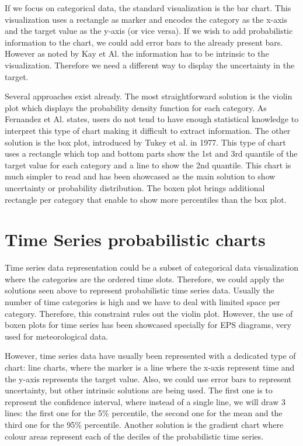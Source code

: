 \documentclass[a4paper,3p,sort&compress]{elsarticle}
\begin{document}
If we focus on categorical data, the standard visualization is the bar chart. This visualization uses a rectangle as marker and 
encodes the category as the x-axis and the target value as the y-axis (or vice versa). If we wish to add probabilistic information 
to the chart, we could add error bars to the already present bars. However as noted by Kay et Al. \cite{kay_when_2016}
the information has to be intrinsic to the visualization. Therefore we need a different way to display the uncertainty in the target.

Several approaches exist already. The most straightforward solution is the violin plot which displays the probability density function for each category. As Fernandez et Al. states, users do not tend to have enough statistical knowledge to interpret this type of chart making it difficult to extract information. The other solution is the box plot, introduced by Tukey et al. in 1977. This type of chart uses a rectangle which top and bottom parts show the 1st and 3rd quantile of the target value for each category and a line to show the 2nd quantile. This chart is much simpler to read and has been showcased as the main solution to show uncertainty or probability distribution. The boxen plot brings additional rectangle per category that enable to show more percentiles than the box plot.

\section{Time Series probabilistic charts}
\label{sec:time_series}

Time series data representation could be a subset of categorical data visualization where the categories are the ordered time slots. 
Therefore, we could apply the solutions seen above to represent probabilistic time series data. Usually the number of time categories
is high and we have to deal with limited space per category. Therefore, this constraint rules out the violin plot. However, the use of boxen plots for time series has been showcased specially for EPS diagrams, very used for meteorological data.

However, time series data have usually been represented with a dedicated type of chart: line charts, where the marker is a 
line where the x-axis represent time and the y-axis represents the target value. Also, we could use error bars to represent uncertainty,
but other intrinsic solutions are being used. The first one is to represent the confidence interval, where instead of a single line, we 
will draw 3 lines: the first one for the 5\% percentile, the second one for the mean and the third one for the 95\% percentile. 
Another solution is the gradient chart where colour areas represent each of the deciles of the probabilistic time series.
\end{document}
